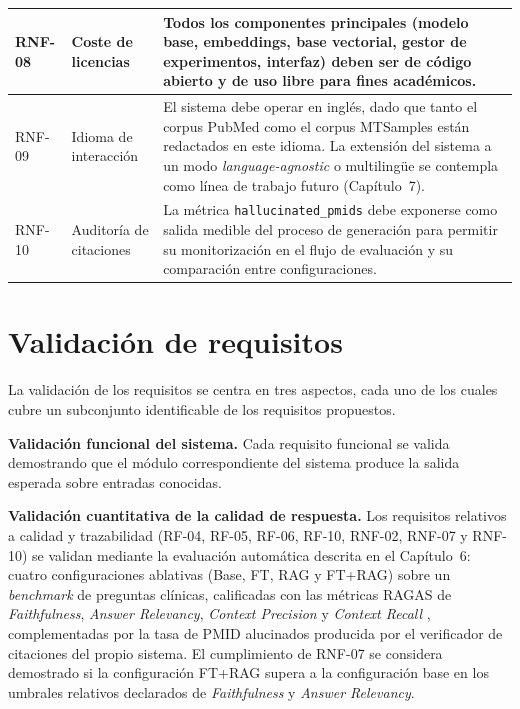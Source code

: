 \documentclass[11pt,a4paper,spanish]{book}
\numberwithin{equation}{chapter}
\numberwithin{figure}{chapter}
\begin{document}
{\begin{longtable}{|p{}|p{}|p{}|}
\hline
RNF-08 & Coste de licencias & Todos los componentes principales (modelo base, embeddings, base vectorial, gestor de experimentos, interfaz) deben ser de código abierto y de uso libre para fines académicos. \\
\hline
RNF-09 & Idioma de interacción & El sistema debe operar en inglés, dado que tanto el corpus PubMed como el corpus MTSamples están redactados en este idioma. La extensión del sistema a un modo \textit{language-agnostic} o multilingüe se contempla como línea de trabajo futuro (Capítulo~7). \\
\hline
RNF-10 & Auditoría de citaciones & La métrica \texttt{hallucinated\_pmids} debe exponerse como salida medible del proceso de generación para permitir su monitorización en el flujo de evaluación y su comparación entre configuraciones. \\
\hline
\end{longtable}
}


\section{Validación de requisitos}
\label{sec:c4_validacion}

La validación de los requisitos se centra en tres aspectos, cada uno de los cuales cubre un subconjunto identificable de los requisitos propuestos.

\textbf{Validación funcional del sistema.} Cada requisito funcional se valida demostrando que el módulo correspondiente del sistema produce la salida esperada sobre entradas conocidas.

\textbf{Validación cuantitativa de la calidad de respuesta.} Los requisitos relativos a calidad y trazabilidad (RF-04, RF-05, RF-06, RF-10, RNF-02, RNF-07 y RNF-10) se validan mediante la evaluación automática descrita en el Capítulo~6: cuatro configuraciones ablativas (Base, FT, RAG y FT+RAG) sobre un \textit{benchmark} de preguntas clínicas, calificadas con las métricas RAGAS de \textit{Faithfulness}, \textit{Answer Relevancy}, \textit{Context Precision} y \textit{Context Recall} \cite{es2025ragasautomatedevaluationretrieval}, complementadas por la tasa de PMID alucinados producida por el verificador de citaciones del propio sistema. El cumplimiento de RNF-07 se considera demostrado si la configuración FT+RAG supera a la configuración base en los umbrales relativos declarados de \textit{Faithfulness} y \textit{Answer Relevancy}.
\end{document}
